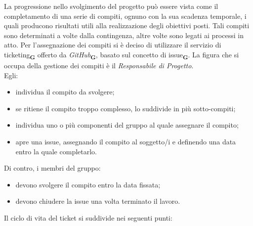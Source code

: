 La progressione nello svolgimento del progetto può essere vista come il completamento di una serie di compiti, ognuno con la sua scadenza temporale, i quali producono risultati utili alla realizzazione degli obiettivi posti. Tali compiti sono determinati a volte dalla contingenza, altre volte sono legati ai processi in atto. Per l’assegnazione dei compiti si è deciso di utilizzare il servizio di ticketing\textsubscript{\textbf{G}} offerto da \textit{GitHub}\textsubscript{\textbf{G}}, basato sul concetto di issue\textsubscript{\textbf{G}}. La figura che si occupa della gestione dei compiti è il \textit{Responsabile di Progetto}.\\
Egli:
\begin{itemize}
    \item individua il compito da svolgere;
    \item se ritiene il compito troppo complesso, lo suddivide in più sotto-compiti;
    \item individua uno o più componenti del gruppo al quale assegnare il compito;
    \item apre una issue, assegnando il compito al soggetto/i e definendo una data entro la quale completarlo.

\end{itemize}
Di contro, i membri del gruppo:
\begin{itemize}
    \item devono svolgere il compito entro la data fissata;
    \item devono chiudere la issue una volta terminato il lavoro.
\end{itemize}
Il ciclo di vita del ticket si suddivide nei seguenti punti:
